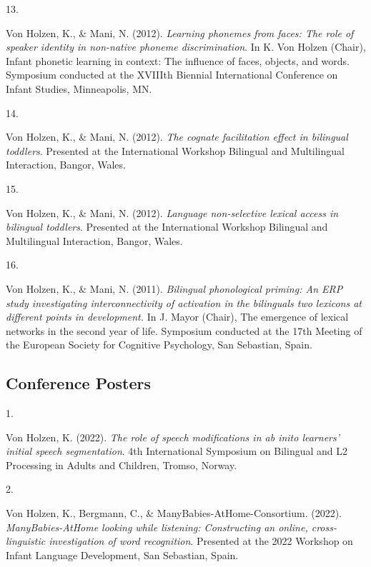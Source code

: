 \documentclass[10pt,a4paper,]{article}
\newlength{\cslhangindent}
\newlength{\csllabelwidth}
\newcommand{\CSLLeftMargin}[1]{\parbox[t]{\csllabelwidth}{\hfill #1~}}
\newcommand{\CSLRightInline}[1]{\parbox[t]{\linewidth - \cslhangindent - \csllabelwidth}{#1}\vspace{0.8ex}}
\begin{document}
\leavevmode{}%
\CSLLeftMargin{13. }%
\CSLRightInline{Von Holzen, K., \& Mani, N. (2012). \emph{Learning
phonemes from faces: The role of speaker identity in non-native phoneme
discrimination}. In K. Von Holzen (Chair), Infant phonetic learning in
context: The influence of faces, objects, and words. Symposium conducted
at the XVIIIth Biennial International Conference on Infant Studies,
Minneapolis, MN.}

\leavevmode{}%
\CSLLeftMargin{14. }%
\CSLRightInline{Von Holzen, K., \& Mani, N. (2012). \emph{The cognate
facilitation effect in bilingual toddlers}. Presented at the
International Workshop Bilingual and Multilingual Interaction, Bangor,
Wales.}

\leavevmode{}%
\CSLLeftMargin{15. }%
\CSLRightInline{Von Holzen, K., \& Mani, N. (2012). \emph{Language
non-selective lexical access in bilingual toddlers}. Presented at the
International Workshop Bilingual and Multilingual Interaction, Bangor,
Wales.}

\leavevmode{}%
\CSLLeftMargin{16. }%
\CSLRightInline{Von Holzen, K., \& Mani, N. (2011). \emph{Bilingual
phonological priming: An ERP study investigating interconnectivity of
activation in the bilinguals two lexicons at different points in
development.} In J. Mayor (Chair), The emergence of lexical networks in
the second year of life. Symposium conducted at the 17th Meeting of the
European Society for Cognitive Psychology, San Sebastian, Spain.}

\hypertarget{conference-posters}{%
\subsection{Conference Posters}\label{conference-posters}}

\hypertarget{bibliography}{}
\leavevmode{}%
\CSLLeftMargin{1. }%
\CSLRightInline{Von Holzen, K. (2022). \emph{The role of speech
modifications in ab inito learners' initial speech segmentation}. 4th
International Symposium on Bilingual and L2 Processing in Adults and
Children, Tromso, Norway.}

\leavevmode{}%
\CSLLeftMargin{2. }%
\CSLRightInline{Von Holzen, K., Bergmann, C., \&
ManyBabies-AtHome-Consortium. (2022). \emph{ManyBabies-AtHome looking
while listening: Constructing an online, cross-linguistic investigation
of word recognition}. Presented at the 2022 Workshop on Infant Language
Development, San Sebastian, Spain.}
\end{document}
